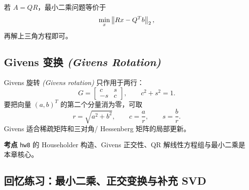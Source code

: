 \documentclass{article}
\newcommand{\exam}{\textcolor{red!65!black}{\textbf{考点}}}
\newcommand{\eng}[1]{\texorpdfstring{{\normalfont\rmfamily\itshape\textcolor{blue!65!black}{(#1)}}}{(#1)}}
\begin{document}
若 $A=QR$，最小二乘问题等价于
\[
  \min_x\left\| Rx-Q^Tb \right\|_2,
\]
再解上三角方程即可。

\subsection{Givens 变换 \eng{Givens Rotation}}

Givens 旋转 \eng{Givens rotation} 只作用于两行：
\[
  G=
  \begin{bmatrix}
    c&s\\
    -s&c
  \end{bmatrix},\qquad c^2+s^2=1.
\]
要把向量 $(a,b)^T$ 的第二个分量消为零，可取
\[
  r=\sqrt{a^2+b^2},\qquad c=\frac{a}{r},\qquad s=\frac{b}{r}.
\]
Givens 适合稀疏矩阵和三对角/ Hessenberg 矩阵的局部更新。

\exam{} \texttt{hw8} 的 Householder 构造、Givens 正交性、QR 解线性方程组与最小二乘是本章核心。

\subsection{回忆练习：最小二乘、正交变换与补充 SVD}
\end{document}
